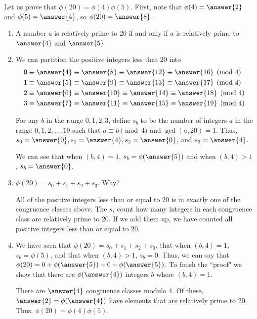 \documentclass{../ximera}
\begin{document}
\begin{br}\label{br:multiplicative-proof}
  Let us prove that $\phi(20)=\phi(4)\phi(5)$. First, note that $\phi(4)=\answer{2}$ and $\phi(5)=\answer{4}$, so $\phi(20)=\answer{8}$.
  \begin{enumerate}
    \item A number $a$ is relatively prime to $20$ if and only if $a$ is relatively prime to $\answer{4}$ and $\answer{5}$ %
    
    \item  
    We can partition the positive integers less that $20$ into 
    \begin{align*}
      & 0\equiv\answer{4}\equiv\answer{8}\equiv\answer{12}\equiv\answer{16}\pmod 4\\
      & 1\equiv\answer{5}\equiv\answer{9}\equiv\answer{13}\equiv\answer{17}\pmod 4\\
      & 2\equiv\answer{6}\equiv\answer{10}\equiv\answer{14}\equiv\answer{18}\pmod 4\\
      & 3\equiv\answer{7}\equiv\answer{11}\equiv\answer{15}\equiv\answer{19}\pmod 4
    \end{align*}
 
    For any $b$ in the range $0,1,2,3$, define $s_b$ to be the number of integers $a$ in the range $0,1,2,\dots, 19$ such that $a\equiv b \pmod 4$ and $\gcd(a,20)=1$. Thus, $s_0=\answer{0}, s_1=\answer{4}, s_2=\answer{0}$, and $s_3=\answer{4}$.
 
    We can see that when $(b,4)=1$, $s_b=\phi(\answer{5})$ and when $(b,4)>1$, $s_b=\answer{0}$.
 
    \item $\phi(20)=s_0+s_1+s_2+s_3$. Why? 
 
    \begin{solution}
      All of the positive integers less than or equal to $20$ is in exactly one of the congruence classes above. The $s_i$ count how many integers in each congruence class are relatively prime to $20$. If we add them up, we have counted all positive integers less than or equal to $20$.
    \end{solution}
 
    \item We have seen that $\phi(20)=s_0+s_1+s_2+s_3$, that when $(b,4)=1$, $s_b=\phi(5)$, and that when $(b,4)>1$, $s_b=0$. Thus, we can say that $\phi(20)=0+\phi(\answer{5})+0+\phi(\answer{5})$. To finish the 	``proof" we show that there are $\phi(\answer{4})$ integers $b$ where $(b,4)=1$. 
 
    \begin{solution}
      There are $\answer{4}$ congruence classes modulo 4. Of these, $\answer{2}=\phi(\answer{4})$ have elements that are relatively prime to $20$. Thus, $\phi(20)=\phi(4)\phi(5)$.
    \end{solution}
  \end{enumerate}
 
\end{br}
\end{document}
